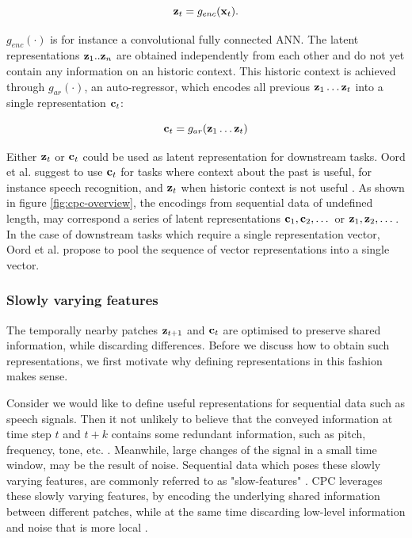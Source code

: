 	$$
	\mathbf{z}_t = g_{enc}(\mathbf{x}_t) .
	$$
	
	$g_{enc}( \cdot )$ is for instance a convolutional fully connected ANN. The latent representations $\mathbf{z}_1..\mathbf{z}_n$ are obtained independently from each other and do not yet contain any information on an historic context. This historic context is achieved through $g_{ar}( \cdot )$, an auto-regressor, which encodes all previous $\mathbf{z}_1 \dots \mathbf{z}_t$ into a single representation $\mathbf{c}_t$:
	
	$$
	\mathbf{c}_t = g_{ar}(\mathbf{z}_1 \dots \mathbf{z}_t)
	$$
	
	Either $\mathbf{z}_t$ or $\mathbf{c}_t$ could be used as latent representation for downstream tasks. Oord et al. suggest to use $\mathbf{c}_t$ for tasks where context about the past is useful, for instance speech recognition, and $\mathbf{z}_t$ when historic context is not useful \cite{oordRepresentationLearningContrastive2019}. As shown in figure \ref{fig:cpc-overview}, the encodings from sequential data of undefined length, may correspond a series of latent representations $\mathbf{c}_1, \mathbf{c}_2, \dots $ or $\mathbf{z}_1, \mathbf{z}_2, \dots $. In the case of downstream tasks which require a single representation vector, Oord et al. propose to pool the sequence of vector representations into a single vector.
	

\subsubsection{Slowly varying features}
	The temporally nearby patches $\mathbf{z}_{t+1}$ and $\mathbf{c}_t$ are optimised to preserve shared information, while discarding differences. Before we discuss how to obtain such representations, we first motivate why defining representations in this fashion makes sense.
	
	Consider we would like to define useful representations for sequential data such as speech signals. Then it not unlikely to believe that the conveyed information at time step $t$ and $t+k$ contains some redundant information, such as pitch, frequency, tone, etc. \cite{raoUnderstandingGradientIsolatedLearning2020}. Meanwhile, large changes of the signal in a small time window, may be the result of noise. Sequential data which poses these slowly varying features, are commonly referred to as "slow-features" \cite{zhangSlowFeatureAnalysis2012}. CPC leverages these slowly varying features, by encoding the underlying shared information between different patches, while at the same time discarding low-level information and noise that is more local \cite{oordRepresentationLearningContrastive2019}.


